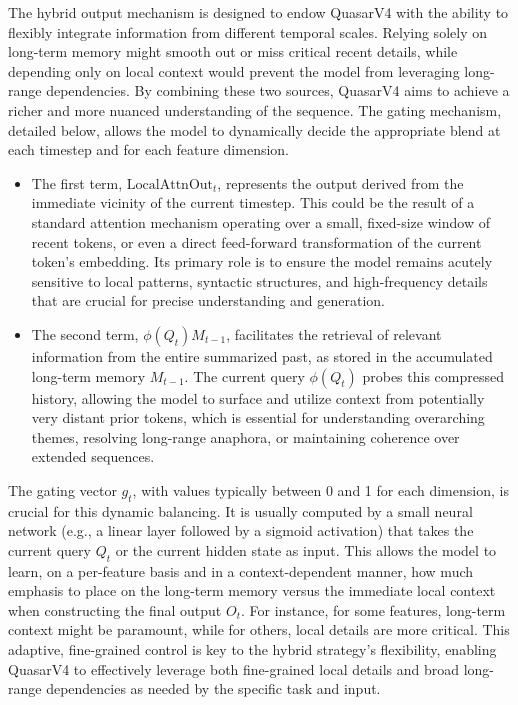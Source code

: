 \documentclass{article}
\begin{document}
The hybrid output mechanism is designed to endow QuasarV4 with the ability to flexibly integrate information from different temporal scales. Relying solely on long-term memory might smooth out or miss critical recent details, while depending only on local context would prevent the model from leveraging long-range dependencies. By combining these two sources, QuasarV4 aims to achieve a richer and more nuanced understanding of the sequence. The gating mechanism, detailed below, allows the model to dynamically decide the appropriate blend at each timestep and for each feature dimension.

\begin{itemize}
    \item The first term, $\text{LocalAttnOut}_t$, represents the output derived from the immediate vicinity of the current timestep. This could be the result of a standard attention mechanism operating over a small, fixed-size window of recent tokens, or even a direct feed-forward transformation of the current token's embedding. Its primary role is to ensure the model remains acutely sensitive to local patterns, syntactic structures, and high-frequency details that are crucial for precise understanding and generation.
    \item The second term, $\phi(Q_t) M_{t-1}$, facilitates the retrieval of relevant information from the entire summarized past, as stored in the accumulated long-term memory $M_{t-1}$. The current query $\phi(Q_t)$ probes this compressed history, allowing the model to surface and utilize context from potentially very distant prior tokens, which is essential for understanding overarching themes, resolving long-range anaphora, or maintaining coherence over extended sequences.
\end{itemize}
The gating vector $g_t$, with values typically between 0 and 1 for each dimension, is crucial for this dynamic balancing. It is usually computed by a small neural network (e.g., a linear layer followed by a sigmoid activation) that takes the current query $Q_t$ or the current hidden state as input. This allows the model to learn, on a per-feature basis and in a context-dependent manner, how much emphasis to place on the long-term memory versus the immediate local context when constructing the final output $O_t$. For instance, for some features, long-term context might be paramount, while for others, local details are more critical. This adaptive, fine-grained control is key to the hybrid strategy's flexibility, enabling QuasarV4 to effectively leverage both fine-grained local details and broad long-range dependencies as needed by the specific task and input.
\end{document}
